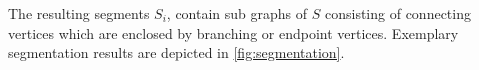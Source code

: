The resulting segments $S_i$, contain sub graphs of $S$ consisting of connecting vertices which are enclosed by branching or endpoint vertices.
%
Exemplary segmentation results are depicted in \autoref{fig:segmentation}.


